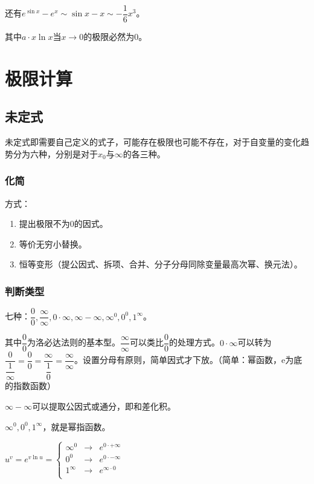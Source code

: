 \documentclass[UTF8]{ctexart}
\begin{document}
还有$e^{\sin x}-e^x\sim\sin x-x\sim-\dfrac{1}{6}x^3$。

其中$a\cdot x\ln x$当$x\to 0$的极限必然为0。

\section{极限计算}

\subsection{未定式}

未定式即需要自己定义的式子，可能存在极限也可能不存在，对于自变量的变化趋势分为六种，分别是对于$x_0$与$\infty$的各三种。

\subsubsection{化简}

方式：

\begin{enumerate}
    \item 提出极限不为0的因式。
    \item 等价无穷小替换。
    \item 恒等变形（提公因式、拆项、合并、分子分母同除变量最高次幂、换元法）。
\end{enumerate}

\subsubsection{判断类型}

七种：$\dfrac{0}{0},\dfrac{\infty}{\infty},0\cdot\infty,\infty-\infty,\infty^0,0^0,1^\infty$。

其中$\dfrac{0}{0}$为洛必达法则的基本型。$\dfrac{\infty}{\infty}$可以类比$\dfrac{0}{0}$的处理方式。$0\cdot\infty$可以转为$\dfrac{0}{\dfrac{1}{\infty}}=\dfrac{0}{0}=\dfrac{\infty}{\dfrac{1}{0}}=\dfrac{\infty}{\infty}$。设置分母有原则，简单因式才下放。（简单：幂函数，e为底的指数函数）

$\infty-\infty$可以提取公因式或通分，即和差化积。

$\infty^0,0^0,1^\infty$，就是幂指函数。

$
u^v=e^{v\ln u}=\left\{
\begin{array}{lcl}
    \infty^0 & \rightarrow & e^{0\cdot+\infty} \\
    0^0 & \rightarrow & e^{0\cdot-\infty} \\
    1^\infty & \rightarrow & e^{\infty\cdot 0} \\
\end{array} \right.
$
\end{document}
